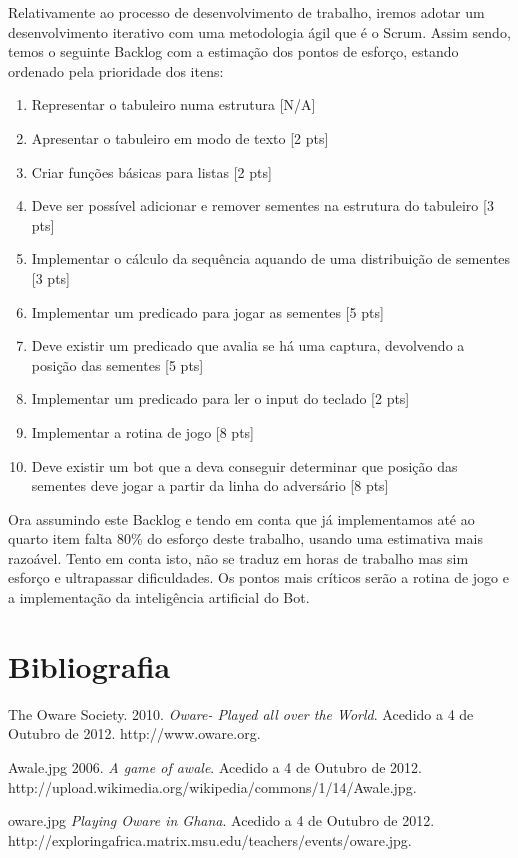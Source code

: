 \documentclass[15pt,a4paper]{article}
\begin{document}
\indent Relativamente ao processo de desenvolvimento de trabalho, iremos adotar um desenvolvimento iterativo com uma metodologia ágil que é o Scrum. Assim sendo, temos o seguinte Backlog com a estimação dos pontos de esforço, estando ordenado pela prioridade dos itens:

\begin{enumerate}
  \item Representar o tabuleiro numa estrutura [N/A]
  \item Apresentar o tabuleiro em modo de texto [2 pts]
  \item Criar funções básicas para listas [2 pts]
  \item Deve ser possível adicionar e remover sementes na estrutura do tabuleiro [3 pts]
  \item Implementar o cálculo da sequência aquando de uma distribuição de sementes [3 pts]
  \item Implementar um predicado para jogar as sementes [5 pts]
  \item Deve existir um predicado que avalia se há uma captura, devolvendo a posição das sementes [5 pts]
  \item Implementar um predicado para ler o input do teclado [2 pts]
  \item Implementar a rotina de jogo [8 pts]
  \item Deve existir um bot que a deva conseguir determinar que posição das sementes deve jogar a partir da linha do adversário [8 pts]
\end{enumerate}

Ora assumindo este Backlog e tendo em conta que já implementamos até ao quarto item falta 80\% do esforço deste trabalho, usando uma estimativa mais razoável. Tento em conta isto, não se traduz em horas de trabalho mas sim esforço e ultrapassar dificuldades. Os pontos mais críticos serão a rotina de jogo e a implementação da inteligência artificial do Bot.
\newpage
\section{Bibliografia}
\begin{thebibliography}{9}

  The Oware Society.
  2010.
  \emph{ Oware- Played all over the World}.
  Acedido a 4 de Outubro de 2012.
  http://www.oware.org.
  
  Awale.jpg
  2006.
  \emph{A game of awale}.
  Acedido a 4 de Outubro de 2012.
  http://upload.wikimedia.org/wikipedia/commons/1/14/Awale.jpg.
  
	oware.jpg
  \emph{Playing Oware in Ghana}.
  Acedido a 4 de Outubro de 2012.
  http://exploringafrica.matrix.msu.edu/teachers/events/oware.jpg.

\end{thebibliography}
\end{document}
